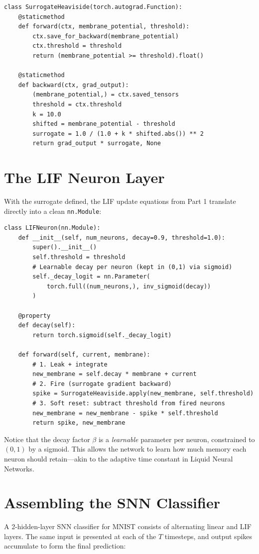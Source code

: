 \documentclass[12pt]{article}
\begin{document}
\begin{lstlisting}
class SurrogateHeaviside(torch.autograd.Function):
    @staticmethod
    def forward(ctx, membrane_potential, threshold):
        ctx.save_for_backward(membrane_potential)
        ctx.threshold = threshold
        return (membrane_potential >= threshold).float()

    @staticmethod
    def backward(ctx, grad_output):
        (membrane_potential,) = ctx.saved_tensors
        threshold = ctx.threshold
        k = 10.0
        shifted = membrane_potential - threshold
        surrogate = 1.0 / (1.0 + k * shifted.abs()) ** 2
        return grad_output * surrogate, None
\end{lstlisting}

\section*{The LIF Neuron Layer}
With the surrogate defined, the LIF update equations from Part 1 translate directly into a clean \texttt{nn.Module}:

\begin{lstlisting}
class LIFNeuron(nn.Module):
    def __init__(self, num_neurons, decay=0.9, threshold=1.0):
        super().__init__()
        self.threshold = threshold
        # Learnable decay per neuron (kept in (0,1) via sigmoid)
        self._decay_logit = nn.Parameter(
            torch.full((num_neurons,), inv_sigmoid(decay))
        )

    @property
    def decay(self):
        return torch.sigmoid(self._decay_logit)

    def forward(self, current, membrane):
        # 1. Leak + integrate
        new_membrane = self.decay * membrane + current
        # 2. Fire (surrogate gradient backward)
        spike = SurrogateHeaviside.apply(new_membrane, self.threshold)
        # 3. Soft reset: subtract threshold from fired neurons
        new_membrane = new_membrane - spike * self.threshold
        return spike, new_membrane
\end{lstlisting}

Notice that the decay factor $\beta$ is a \textit{learnable} parameter per neuron, constrained to $(0,1)$ by a sigmoid. This allows the network to learn how much memory each neuron should retain—akin to the adaptive time constant in Liquid Neural Networks.

\section*{Assembling the SNN Classifier}
A 2-hidden-layer SNN classifier for MNIST consists of alternating linear and LIF layers. The same input is presented at each of the $T$ timesteps, and output spikes accumulate to form the final prediction:
\end{document}
